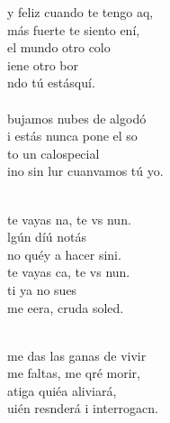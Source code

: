 \begin{cancion}%
	y feliz cuando te tengo aq,\\
	 más fuerte te siento ení,\\
	el mundo  otro colo\\
	iene otro bor \\
	ndo tú estásquí.\\
\jump\\
	bujamos nubes de algodó\\
	i estás nunca pone el so\\
	to un calospecial \\
	ino sin lur cuanvamos tú yo.\\\jump\\
	\begin{chorus}%
	 te vayas na, te vs nun.\\
	lgún díú notás\\
	no  quéy a hacer sini. \\
	 te vayas ca, te vs nun.\\
	ti ya no  sues\\
	me eera, cruda soled.\\
	\end{chorus}%
	\jump\\
	 me das las ganas de vivir\\
	me faltas, me qré morir,\\
	atiga quiéa aliviará,\\
	uién resnderá i interrogacn. \\

\end{cancion}
